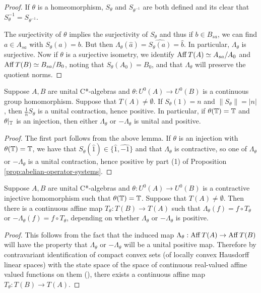 \documentclass[12pt]{amsart}
\begin{document}
\begin{lemma}
\begin{proof}
If $\theta$ is a homeomorphism, $S_\theta$ and $S_{\theta^{-1}}$ are both defined and its clear that $S_\theta^{-1} = S_{\theta^{-1}}$.

The surjectivity of $\theta$ implies the surjectivity of $S_\theta$ and thus if $b \in B_{sa}$, we can find $a \in A_{sa}$ with $S_\theta(a) = b$. But then $\Lambda_\theta(\hat{a}) = \widehat{S_\theta(a)} = \hat{b}$. In particular, $\Lambda_\theta$ is surjective. Now if $\theta$ is a surjective isometry, we identify $\operatorname{Aff} T(A) \simeq A_{sa}/A_0$ and $\operatorname{Aff} T(B) \simeq B_{sa}/B_0$, noting that $S_\theta(A_0) = B_0$, and that $\Lambda_\theta$ will preserve the quotient norms. 
\end{proof}
\end{lemma}

\begin{cor}
Suppose $A,B$ are unital C*-algebras and $\theta: U^0(A) \to U^0(B)$ is a continuous group homomorphism. Suppose that $T(A) \neq \emptyset$. If $S_\theta(1) = n$ and $\|S_\theta\| = |n|$, then $\frac{1}{n}S_\theta$ is a unital contraction, hence positive. In particular, if $\theta(\mathbb{T}) = \mathbb{T}$ and $\theta|_{\mathbb{T}}$ is an injection, then either $\Lambda_\theta$ or $-\Lambda_\theta$ is unital and positive. 
\begin{proof}
The first part follows from the above lemma. If $\theta$ is an injection with $\theta(\mathbb{T}) = \mathbb{T}$, we have that $S_\theta(\hat{1}) \in \{\hat{1},\widehat{-1}\}$ and that $\Lambda_\theta$ is contractive, so one of $\Lambda_\theta$ or $-\Lambda_\theta$ is a unital contraction, hence positive by part (1) of Proposition \ref{prop:abelian-operator-systems}. 
\end{proof}
\end{cor}

\begin{theorem}\label{thm:affine-map-from-injection}
Suppose $A,B$ are unital C*-algebras and $\theta: U^0(A) \to U^0(B)$ is a contractive injective homomorphism such that $\theta(\mathbb{T}) = \mathbb{T}$. Suppose that $T(A) \neq \emptyset$. Then there is a continuous affine map $T_\theta: T(B) \to T(A)$ such that $\Lambda_\theta(f) = f \circ T_\theta$ or $-\Lambda_\theta(f) = f \circ T_\theta$, depending on whether $\Lambda_\theta$ or $-\Lambda_\theta$ is positive.
\begin{proof}
This follows from the fact that the induced map $\Lambda_\theta: \operatorname{Aff} T(A) \to \operatorname{Aff} T(B)$ will have the property that $\Lambda_\theta$ or $-\Lambda_\theta$ will be a  unital positive map. Therefore by contravariant identification of compact convex sets (of locally convex Hausdorff linear spaces) with the state space of the space of continuous real-valued affine valued functions on them (\cite[Chapter 7]{Goodearlbook}), there exists a continuous affine map $T_\theta: T(B) \to T(A)$. 
\end{proof}
\end{theorem}
\end{document}
